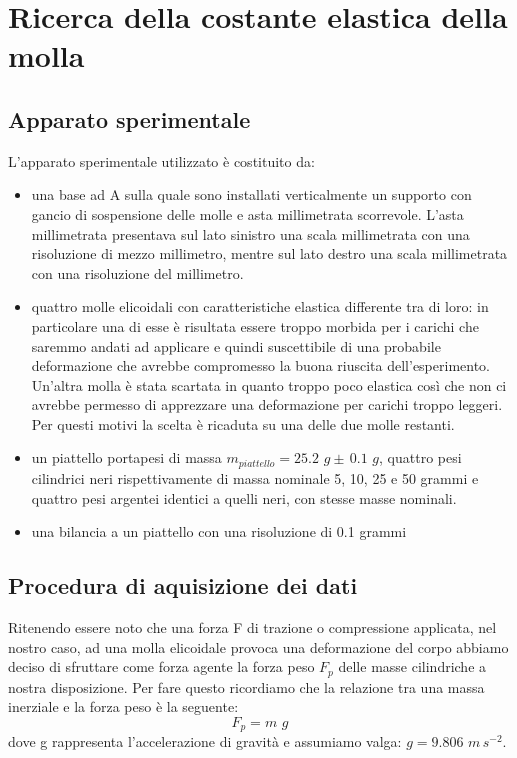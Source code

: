 \section{Ricerca della costante elastica della molla}

\subsection{Apparato sperimentale}
L'apparato sperimentale utilizzato è costituito da:
	\begin{itemize}
		\item{una base ad A sulla quale sono installati verticalmente un supporto con gancio di sospensione delle molle e asta millimetrata scorrevole. L'asta millimetrata presentava sul lato sinistro una scala millimetrata con una risoluzione di mezzo millimetro, mentre sul lato destro una scala millimetrata con una risoluzione del millimetro.}
		\item{quattro molle elicoidali con caratteristiche elastica differente tra di loro: in particolare una di esse è risultata essere troppo morbida per i carichi che saremmo andati ad applicare e quindi suscettibile di una probabile deformazione che avrebbe compromesso la buona riuscita dell'esperimento. Un'altra molla è stata scartata in quanto troppo poco elastica così che non ci avrebbe permesso di apprezzare una deformazione per carichi troppo leggeri. Per questi motivi la scelta è ricaduta su una delle due molle restanti.}
		\item{un piattello portapesi di massa $m_{piattello} = 25.2\,\,g \pm\, 0.1\,\,g$, quattro pesi cilindrici neri rispettivamente di massa nominale 5, 10, 25 e 50 grammi e quattro pesi argentei identici a quelli neri, con stesse masse nominali.}
		\item{una bilancia a un piattello con una risoluzione di 0.1 grammi}
	\end{itemize}

\subsection{Procedura di aquisizione dei dati}
Ritenendo essere noto che una forza F di trazione o compressione applicata, nel nostro caso, ad una molla elicoidale provoca una deformazione del corpo abbiamo deciso di sfruttare come forza agente la forza peso $F_{p}$ delle masse cilindriche a nostra disposizione. Per fare questo ricordiamo che la relazione tra una massa inerziale e la forza peso è la seguente:
\begin{equation}
	F_{p} = m\,\,g
\end{equation}
dove g rappresenta l'accelerazione di gravità e assumiamo valga: $g = 9.806\,\,m\,s^{-2}$.

